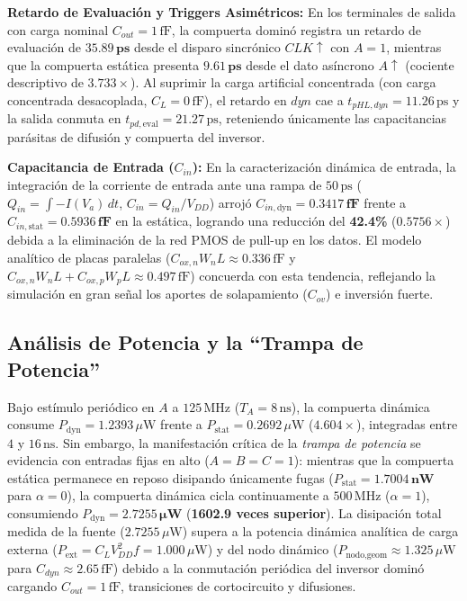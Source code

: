 \noindent\textbf{Retardo de Evaluación y Triggers Asimétricos:} En los terminales de salida con carga nominal $C_{out} = 1\,\text{fF}$, la compuerta dominó registra un retardo de evaluación de $\mathbf{35.89\,\text{ps}}$ desde el disparo sincrónico $CLK\uparrow$ con $A=1$, mientras que la compuerta estática presenta $\mathbf{9.61\,\text{ps}}$ desde el dato asíncrono $A\uparrow$ (cociente descriptivo de $3.733\times$). Al suprimir la carga artificial concentrada (con carga concentrada desacoplada, $C_L = 0\,\text{fF}$), el retardo en $dyn$ cae a $t_{pHL,dyn} = 11.26\,\text{ps}$ y la salida conmuta en $t_{pd,\text{eval}} = 21.27\,\text{ps}$, reteniendo únicamente las capacitancias parásitas de difusión y compuerta del inversor.

\noindent\textbf{Capacitancia de Entrada ($C_{in}$):} En la caracterización dinámica de entrada, la integración de la corriente de entrada ante una rampa de $50\,\text{ps}$ ($Q_{in} = \int -I(V_a)\,dt$, $C_{in} = Q_{in}/V_{DD}$) arrojó $C_{in,\text{dyn}} = \mathbf{0.3417\,\text{fF}}$ frente a $C_{in,\text{stat}} = \mathbf{0.5936\,\text{fF}}$ en la estática, logrando una reducción del \textbf{42.4\%} ($0.5756\times$) debida a la eliminación de la red PMOS de pull-up en los datos. El modelo analítico de placas paralelas ($C_{ox,n} W_n L \approx 0.336\,\text{fF}$ y $C_{ox,n} W_n L + C_{ox,p} W_p L \approx 0.497\,\text{fF}$) concuerda con esta tendencia, reflejando la simulación en gran señal los aportes de solapamiento ($C_{ov}$) e inversión fuerte.

\subsection{Análisis de Potencia y la ``Trampa de Potencia''}
Bajo estímulo periódico en $A$ a $125\,\text{MHz}$ ($T_A=8\,\text{ns}$), la compuerta dinámica consume $P_{\text{dyn}} = 1.2393\,\mu\text{W}$ frente a $P_{\text{stat}} = 0.2692\,\mu\text{W}$ ($4.604\times$), integradas entre $4$ y $16\,\text{ns}$. Sin embargo, la manifestación crítica de la \textit{trampa de potencia} se evidencia con entradas fijas en alto ($A=B=C=1$): mientras que la compuerta estática permanece en reposo disipando únicamente fugas ($P_{\text{stat}} = \mathbf{1.7004\,\text{nW}}$ para $\alpha=0$), la compuerta dinámica cicla continuamente a $500\,\text{MHz}$ ($\alpha=1$), consumiendo $P_{\text{dyn}} = \mathbf{2.7255\,\mu\text{W}}$ (\textbf{1602.9 veces superior}). La disipación total medida de la fuente ($2.7255\,\mu\text{W}$) supera a la potencia dinámica analítica de carga externa ($P_{\text{ext}} = C_L V_{DD}^2 f = 1.000\,\mu\text{W}$) y del nodo dinámico ($P_{\text{nodo,geom}} \approx 1.325\,\mu\text{W}$ para $C_{dyn} \approx 2.65\,\text{fF}$) debido a la conmutación periódica del inversor dominó cargando $C_{out}=1\,\text{fF}$, transiciones de cortocircuito y difusiones.


